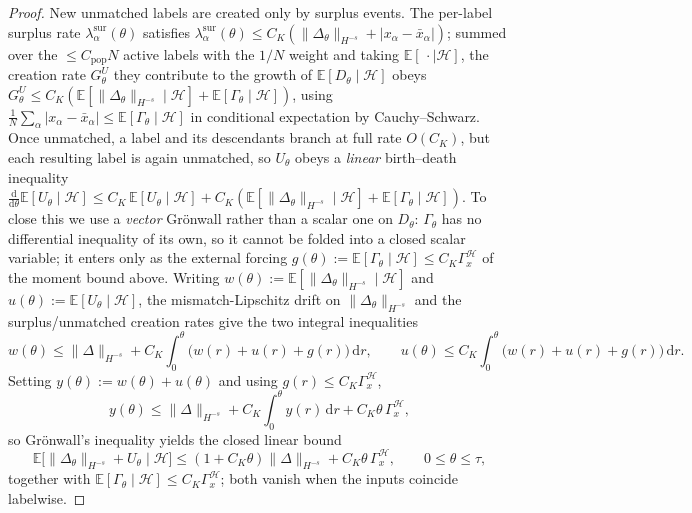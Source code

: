 \documentclass[a4paper,fleqn]{cas-sc}
\theoremstyle{definition}
\theoremstyle{remark}
\begin{document}
\begin{proof}
New unmatched labels are created only by surplus events. The per-label surplus rate
$\lambda^{\mathrm{sur}}_\alpha(\theta)$ satisfies
$\lambda^{\mathrm{sur}}_\alpha(\theta)\le C_K(\|\Delta_\theta\|_{H^{-s}}+|x_\alpha-\bar x_\alpha|)$;
summed over the $\le C_{\mathrm{pop}}N$ active labels with the $1/N$ weight and taking
$\mathbb E[\,\cdot\mid\mathcal H]$, the creation rate $G^U_\theta$ they contribute to the growth of
$\mathbb E[D_\theta\mid\mathcal H]$ obeys
$G^U_\theta\le C_K(\mathbb E[\|\Delta_\theta\|_{H^{-s}}\mid\mathcal H]+\mathbb E[\Gamma_\theta\mid\mathcal H])$,
using $\frac1N\sum_\alpha|x_\alpha-\bar x_\alpha|\le\mathbb E[\Gamma_\theta\mid\mathcal H]$ in
conditional expectation by Cauchy--Schwarz. Once unmatched, a label and its descendants
branch at full rate $O(C_K)$, but each resulting label is again unmatched, so $U_\theta$
obeys a \emph{linear} birth--death inequality
$\frac{\mathrm d}{\mathrm d\theta}\mathbb E[U_\theta\mid\mathcal H]
\le C_K\,\mathbb E[U_\theta\mid\mathcal H]+C_K(\mathbb E[\|\Delta_\theta\|_{H^{-s}}\mid\mathcal H]+\mathbb E[\Gamma_\theta\mid\mathcal H])$.
To close this we use a \emph{vector} Gr\"onwall rather than a scalar one on $D_\theta$:
$\Gamma_\theta$ has no differential inequality of its own, so it cannot be folded into
a closed scalar variable; it enters only as the external forcing
$g(\theta):=\mathbb E[\Gamma_\theta\mid\mathcal H]\le C_K\Gamma_x^{\mathcal H}$ of the
moment bound above. Writing $w(\theta):=\mathbb E[\|\Delta_\theta\|_{H^{-s}}\mid\mathcal H]$
and $u(\theta):=\mathbb E[U_\theta\mid\mathcal H]$, the mismatch-Lipschitz drift on
$\|\Delta_\theta\|_{H^{-s}}$ and the surplus/unmatched creation rates give the two integral
inequalities
\[
w(\theta)\le\|\Delta\|_{H^{-s}}+C_K\!\int_0^\theta\!\bigl(w(r)+u(r)+g(r)\bigr)\,\mathrm dr,
\qquad
u(\theta)\le C_K\!\int_0^\theta\!\bigl(w(r)+u(r)+g(r)\bigr)\,\mathrm dr.
\]
Setting $y(\theta):=w(\theta)+u(\theta)$ and using $g(r)\le C_K\Gamma_x^{\mathcal H}$,
\[
y(\theta)\le\|\Delta\|_{H^{-s}}+C_K\!\int_0^\theta y(r)\,\mathrm dr+C_K\theta\,\Gamma_x^{\mathcal H},
\]
so Gr\"onwall's inequality yields the closed linear bound
\begin{equation}\label{eq:Bstab-Dbound}
\mathbb E\bigl[\|\Delta_\theta\|_{H^{-s}}+U_\theta\mid\mathcal H\bigr]
\le(1+C_K\theta)\|\Delta\|_{H^{-s}}+C_K\theta\,\Gamma_x^{\mathcal H},\qquad 0\le\theta\le\tau,
\end{equation}
together with $\mathbb E[\Gamma_\theta\mid\mathcal H]\le C_K\Gamma_x^{\mathcal H}$; both
vanish when the inputs coincide labelwise.


\end{proof}
\end{document}
